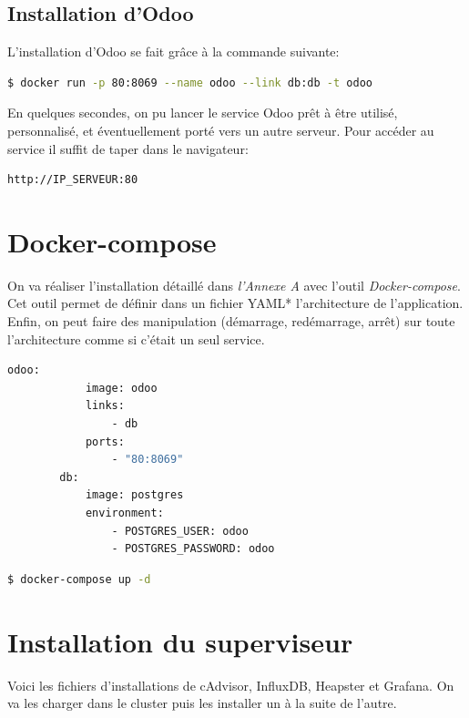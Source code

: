 \section*{Installation d'Odoo}

	L'installation d'Odoo se fait grâce à la commande suivante:
	\begin{lstlisting}[language=bash,caption=Installation d'Odoo]
		$ docker run -p 80:8069 --name odoo --link db:db -t odoo
	\end{lstlisting}

	En quelques secondes, on pu lancer le service Odoo prêt à être utilisé, personnalisé, et éventuellement porté vers un autre serveur. Pour accéder au service il suffit de taper dans le navigateur:

	\begin{lstlisting}[language=bash]
		http://IP_SERVEUR:80
	\end{lstlisting}

	




\chapter{Docker-compose}

	On va réaliser l'installation détaillé dans \emph{l'Annexe A} avec l'outil \emph{Docker-compose}. Cet outil permet de définir dans un fichier YAML* l'architecture de l'application. Enfin, on peut faire des manipulation (démarrage, redémarrage, arrêt) sur toute l'architecture comme si c'était un seul service.

	\begin{lstlisting}[language=bash,caption=Installation d'Odoo avec Docker-compose]
		odoo:
	  		image: odoo
		  	links:
		   		- db
		  	ports:
		   		- "80:8069"
		db:
		  	image: postgres
		  	environment:
  				- POSTGRES_USER: odoo
  				- POSTGRES_PASSWORD: odoo
	\end{lstlisting}

	\begin{lstlisting}[language=bash,caption=Lancement d'Odoo avec Docker-compose]
		$ docker-compose up -d
	\end{lstlisting}


\chapter{Installation du superviseur}
	
	Voici les fichiers d'installations de cAdvisor, InfluxDB, Heapster et Grafana. On va les charger dans le cluster puis les installer un à la suite de l'autre.

